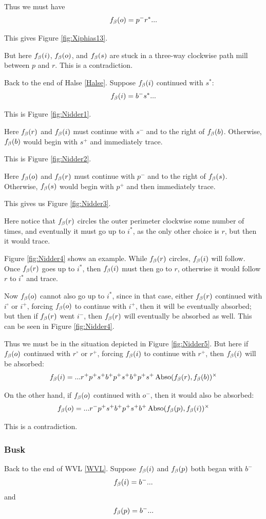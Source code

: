 Thus we must have
$$f_\beta(o) = p^- r^*...$$

This gives Figure \ref{fig:Xiphias13}.

But here $f_\beta(i)$, $f_\beta(o)$, and $f_\beta(s)$ are stuck in a three-way clockwise path mill between $p$ and $r$. This is a contradiction.


Back to the end of Halse \ref{Halse}. Suppose $f_\beta(i)$ continued with $s^*$:
$$f_\beta(i) = b^- s^*...$$ 

This is Figure \ref{fig:Nidder1}.

Here $f_\beta(r)$ and $f_\beta(i)$ must continue with $s^-$ and to the right of $f_\beta(b)$. Otherwise, $f_\beta(b)$ would begin with $s^+$ and immediately trace.

This is Figure \ref{fig:Nidder2}.

Here $f_\beta(o)$ and $f_\beta(r)$ must continue with  $p^-$ and to the right of $f_\beta(s)$. Otherwise, $f_\beta(s)$ would begin with $p^+$ and then immediately trace.

This gives us Figure \ref{fig:Nidder3}.

Here notice that $f_\beta(r)$ circles the outer perimeter clockwise some number of times, and eventually it must go up to $i^*$, as the only other choice is $r$, but then it would trace.

Figure \ref{fig:Nidder4} shows an example. While $f_\beta(r)$ circles, $f_\beta(i)$ will follow. Once $f_\beta(r)$ goes up to $i^*$, then $f_\beta(i)$ must then go to $r$, otherwise it would follow $r$ to $i^*$ and trace.

Now $f_\beta(o)$ cannot also go up to $i^*$, since in that case, either $f_\beta(r)$ continued with $i^\circ$ or $i^+$, forcing $f_\beta(o)$ to continue with $i^+$, then it will be eventually absorbed; but then if $f_\beta(r)$ went $i^-$, then $f_\beta(r)$ will eventually be absorbed as well. This can be seen in Figure \ref{fig:Nidder4}.

Thus we must be in the situation depicted in Figure \ref{fig:Nidder5}. But here if $f_\beta(o)$ continued with $r^\circ$ or $r^+$, forcing $f_\beta(i)$ to continue with $r^+$, then $f_\beta(i)$ will be absorbed:
$$f_\beta(i) = ...r^+ p^+ s^+ b^+ p^+ s^+ b^+ p^+ s^+ \operatorname{Abso}(f_\beta(r), f_\beta(b))^\times$$

On the other hand, if $f_\beta(o)$ continued with $o^-$, then it would also be absorbed:
$$f_\beta(o) = ...r^- p^+ s^+ b^+ p^+ s^+ b^+ \operatorname{Abso}(f_\beta(p), f_\beta(i))^\times$$

This is a contradiction.

\subsubsection{Busk}\label{Busk}
Back to the end of WVL \ref{WVL}. Suppose $f_\beta(i)$ and $f_\beta(p)$ both began with $b^-$
$$f_\beta(i) = b^-...$$
and
$$f_\beta(p) = b^-...$$


